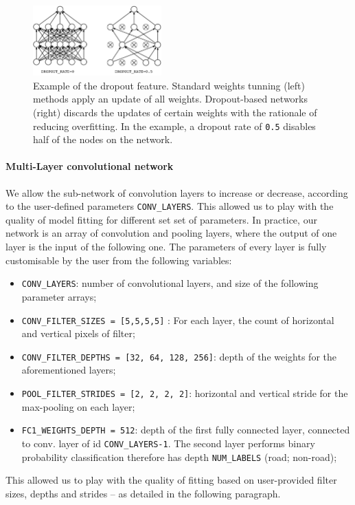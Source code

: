 \documentclass[fleqn,9 pt]{SelfArx} %
\begin{document}
\begin{sloppypar}
\begin{figure}[H]
\centering
\includegraphics[width=0.44\textwidth]{figures/DROPOUT_RATE.pdf}
\caption{\small Example of the dropout feature. Standard weights tunning (left) methods apply an update of all weights. Dropout-based networks (right) discards the updates of certain weights with the rationale of reducing overfitting. In the example, a dropout rate of \texttt{0.5} disables half of the nodes on the network.}
\end{figure}

\paragraph{Multi-Layer convolutional network}

We allow the sub-network of convolution layers to increase or decrease, according to the user-defined parameters \texttt{CONV\_LAYERS}. This allowed us to play with the quality of model fitting for different set set of parameters. In practice, our network is an array of convolution and pooling layers, where the output of one layer is the input of the following one. The parameters of every layer is fully customisable by the user from the following variables:
\begin{itemize}
\item \texttt{CONV\_LAYERS}: number of convolutional layers, and size of the following parameter arrays;
\item \texttt{CONV\_FILTER\_SIZES = [5,5,5,5]} : For each layer, the count of horizontal and vertical pixels of filter;
\item \texttt{CONV\_FILTER\_DEPTHS = [32, 64, 128, 256]}: depth of the weights for the aforementioned layers;
\item \texttt{POOL\_FILTER\_STRIDES = [2, 2, 2, 2]}: horizontal and vertical stride for the max-pooling on each layer;
\item \texttt{FC1\_WEIGHTS\_DEPTH = 512}: depth of the first fully connected layer, connected to conv. layer of id \texttt{CONV\_LAYERS-1}. The second layer performs binary probability classification therefore has depth \texttt{NUM\_LABELS} (road; non-road);
\end{itemize}
  This allowed us to play with the quality of fitting based on user-provided filter sizes, depths and strides -- as detailed in the following paragraph.


\end{sloppypar}
\end{document}
